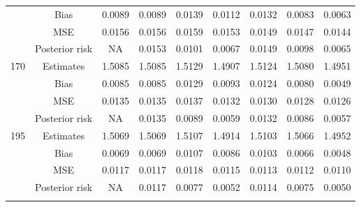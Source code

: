 \documentclass[a4paper,12pt]{report}
\begin{document}
\begin{minipage}{\linewidth}
{\begin{tabular}{|c|c|c|c|c|c|c|c|c|}
			&Bias           &0.0089 &0.0089 &0.0139 &0.0112 &0.0132 &0.0083 &0.0063 \\
			&MSE            &0.0156 &0.0156 &0.0159 &0.0153 &0.0149 &0.0147 &0.0144 \\
			&Posterior risk    &NA &0.0153 &0.0101 &0.0067 &0.0149 &0.0098 &0.0065 \\ \hline
			170&	Estimates      &1.5085 &1.5085 &1.5129 &1.4907 &1.5124 &1.5080 &1.4951 \\
			&Bias           &0.0085 &0.0085 &0.0129 &0.0093 &0.0124 &0.0080 &0.0049 \\
			&MSE            &0.0135 &0.0135 &0.0137 &0.0132 &0.0130 &0.0128 &0.0126 \\
			&Posterior risk    &NA &0.0135 &0.0089 &0.0059 &0.0132 &0.0086 &0.0057 \\\hline
			195&	Estimates      &1.5069 &1.5069 &1.5107 &1.4914 &1.5103 &1.5066 &1.4952 \\
			&Bias           &0.0069 &0.0069 &0.0107 &0.0086 &0.0103 &0.0066 &0.0048 \\
			&MSE            &0.0117 &0.0117 &0.0118 &0.0115 &0.0113 &0.0112 &0.0110 \\
			&Posterior risk    &NA &0.0117 &0.0077 &0.0052 &0.0114 &0.0075 &0.0050 \\ \hline
			\ECC
		\end{tabular}
	}
\end{minipage}
\\
\newpage

{\\ \vspace{1cm}}
\end{document}
